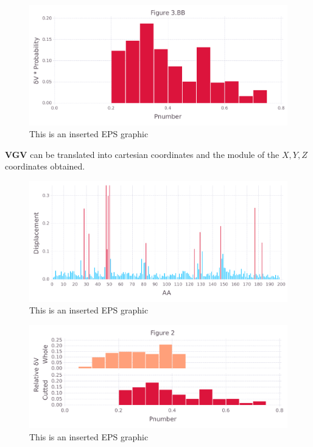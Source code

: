 \documentclass[10pt,letterpaper]{article}
\begin{document}
\begin{figure}[ht]
\begin{center}
\includegraphics[scale=0.5]{1hvr_apo/3bbfigure_hi-precision.pdf}
\caption{This is an inserted EPS graphic}
\label{fig11}
\end{center}
\end{figure}

\FloatBarrier


\textbf{VGV} can be translated into cartesian coordinates and the module of the \(X, Y, Z\) coordinates obtained.

\begin{figure}[ht]
\begin{center}
\includegraphics[scale=0.5]{1hvr_apo/5figure_hi-precision.pdf}
\caption{This is an inserted EPS graphic}
\label{fig13}
\end{center}
\end{figure}

\begin{figure}[ht]
\begin{center}
\includegraphics[scale=0.5]{1hvr_apo/3_both_hi-precision.pdf}
\caption{This is an inserted EPS graphic}
\label{fig13}
\end{center}
\end{figure}
\end{document}
